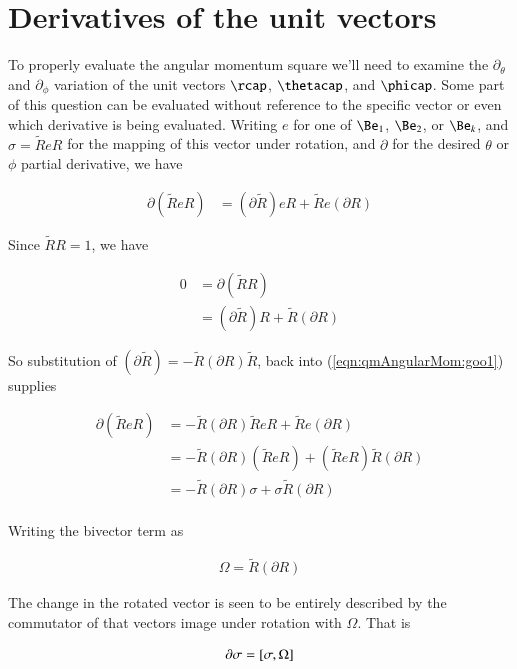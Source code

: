 \section{Derivatives of the unit vectors}

To properly evaluate the angular momentum square we'll need to examine the $\partial_\theta$ and $\partial_\phi$ variation of the unit vectors $\rcap$, $\thetacap$, and $\phicap$.  Some part of this question can be evaluated without reference to the specific vector or even which derivative is being evaluated.  Writing $e$ for one of $\Be_1$, $\Be_2$, or $\Be_k$, and $\sigma = \tilde{R} e R$ for the mapping of this vector under rotation, and $\partial$ for the desired $\theta$ or $\phi$ partial derivative, we have

\begin{align}\label{eqn:qmAngularMom:goo1}
\partial (\tilde{R} e R)
&=
(\partial \tilde{R}) e R + \tilde{R} e (\partial R)
\end{align}

Since $\tilde{R} R = 1$, we have

\begin{align*}
0 
&= \partial (\tilde{R} R) \\
&=
(\partial \tilde{R}) R + \tilde{R} (\partial R)
\end{align*}

So substitution of $(\partial \tilde{R}) = -\tilde{R} (\partial R) \tilde{R}$, back into (\ref{eqn:qmAngularMom:goo1}) supplies

\begin{align*}
\partial (\tilde{R} e R)
&=
-\tilde{R} (\partial R) \tilde{R} e R + \tilde{R} e (\partial R) \\
&=
-\tilde{R} (\partial R) (\tilde{R} e R) + (\tilde{R} e R) \tilde{R} (\partial R) \\
&=
-\tilde{R} (\partial R) \sigma + \sigma \tilde{R} (\partial R) \\
\end{align*}

Writing the bivector term as

\begin{align}\label{eqn:qmAngularMom:goo2}
\Omega = \tilde{R} (\partial R) 
\end{align}

The change in the rotated vector is seen to be entirely described by the commutator of that vectors image under rotation with $\Omega$.  That is

\begin{align}\label{eqn:qmAngularMom:goo3}
\partial \sigma = \left[{\sigma},{\Omega}\right]
\end{align}

